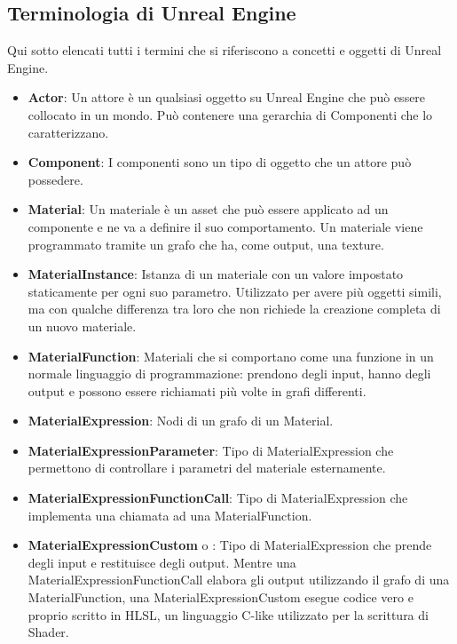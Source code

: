 \documentclass[main.tex]{subfiles}
\begin{document}
\subsection{Terminologia di Unreal Engine}\label{subsec:1_dataStructsUE}
Qui sotto elencati tutti i termini che si riferiscono a concetti e oggetti di Unreal Engine.
\begin{itemize}
    \item \textbf{Actor}: Un attore è un qualsiasi oggetto su Unreal Engine che può essere collocato in un mondo. Può contenere una gerarchia di Componenti che lo caratterizzano.
    \item \textbf{Component}: I componenti sono un tipo di oggetto che un attore può possedere.
    \item \textbf{Material}: Un materiale è un asset che può essere applicato ad un componente e ne va a definire il suo comportamento. Un materiale viene programmato tramite un grafo che ha, come output, una texture.
    \item \textbf{MaterialInstance}: Istanza di un materiale con un valore impostato staticamente per ogni suo parametro. Utilizzato per avere più oggetti simili, ma con qualche differenza tra loro che non richiede la creazione completa di un nuovo materiale.
    \item \textbf{MaterialFunction}: Materiali che si comportano come una funzione in un normale linguaggio di programmazione: prendono degli input, hanno degli output e possono essere richiamati più volte in grafi differenti.
    \item \textbf{MaterialExpression}: Nodi di un grafo di un Material.
    \item \textbf{MaterialExpressionParameter}: Tipo di MaterialExpression che permettono di controllare i parametri del materiale esternamente.
    \item \textbf{MaterialExpressionFunctionCall}: Tipo di MaterialExpression che implementa una chiamata ad una MaterialFunction.
    \item \textbf{MaterialExpressionCustom} o : Tipo di MaterialExpression che prende degli input e restituisce degli output. Mentre una MaterialExpressionFunctionCall elabora gli output utilizzando il grafo di una MaterialFunction, una MaterialExpressionCustom esegue codice vero e proprio scritto in HLSL, un linguaggio C-like utilizzato per la scrittura di Shader.
\end{itemize}
\end{document}
